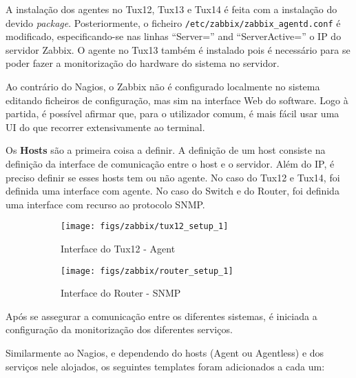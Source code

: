 A instalação dos agentes no Tux12, Tux13 e Tux14 é feita com a instalação do devido \textit{package}.
Posteriormente, o ficheiro \verb|/etc/zabbix/zabbix_agentd.conf| é modificado, especificando-se nas linhas “Server=” and “ServerActive=” o IP do servidor Zabbix.
O agente no Tux13 também é instalado pois é necessário para se poder fazer a monitorização do hardware do sistema no servidor.

\pagebreak

Ao contrário do Nagios, o Zabbix não é configurado localmente no sistema editando ficheiros de configuração, mas sim na interface Web do software.
Logo à partida, é possível afirmar que, para o utilizador comum, é mais fácil usar uma UI do que recorrer extensivamente ao terminal.

Os \textbf{Hosts} são a primeira coisa a definir.
A definição de um host consiste na definição da interface de comunicação entre o host e o servidor.
Além do IP, é preciso definir se esses hosts tem ou não agente.
No caso do Tux12 e Tux14, foi definida uma interface com agente.
No caso do Switch e do Router, foi definida uma interface com recurso ao protocolo SNMP.

\begin{figure}[H]
    \centering
    \begin{subfigure}[b]{0.9\textwidth}
        \centering
        \texttt{[image: figs/zabbix/tux12\_setup\_1]}
        \caption{Interface do Tux12 - Agent}
        \label{fig:tux12_setup_1}
    \end{subfigure}
    \hfill
    \begin{subfigure}[b]{0.9\textwidth}
        \centering
        \texttt{[image: figs/zabbix/router\_setup\_1]}
        \caption{Interface do Router - SNMP}
        \label{fig:router_setup_1}
    \end{subfigure}
    \caption{}
\end{figure}

Após se assegurar a comunicação entre os diferentes sistemas, é iniciada a configuração da monitorização dos diferentes serviços.

\pagebreak

Similarmente ao Nagios, e dependendo do hosts (Agent ou Agentless) e dos serviços nele alojados, os seguintes templates foram adicionados a cada um:

